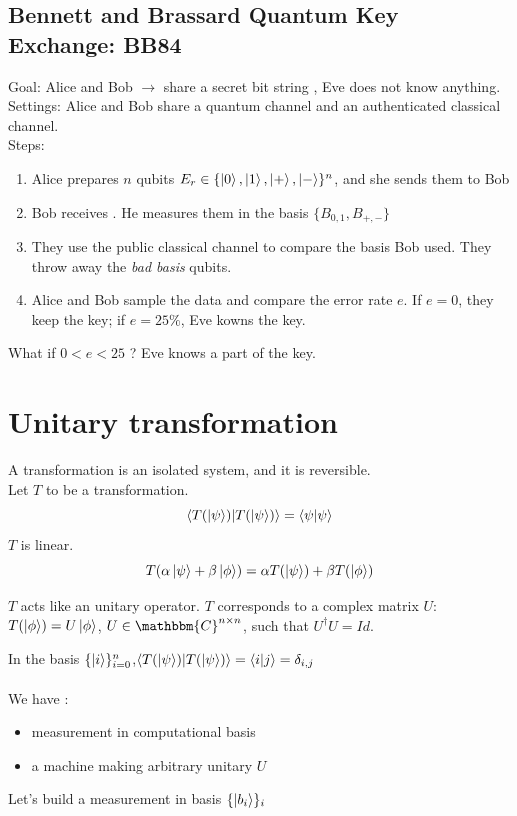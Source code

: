 \documentclass{article}
\begin{document}
\subsection{Bennett and Brassard Quantum Key Exchange: BB84}
Goal: Alice and Bob $\rightarrow$ share a secret bit string , Eve does not know anything.
\\
Settings: Alice and Bob share a quantum channel and an authenticated classical channel.
\\\noindent
Steps:
\begin{enumerate}
    \item Alice prepares $n$ qubits $E_r \in \{\ket{0}, \ket{1}, \ket{+}, \ket{-}\}^n$, and she sends them to Bob
    \item Bob receives . He measures them in the basis $\{B_{0,1}, B_{+,-}\}$
    \item They use the public classical channel to compare the basis Bob used. They throw away the \textit{bad basis} qubits.
    \item Alice and Bob sample the data and compare the error rate $e$. If $e=0$, they keep the key;
        if $e = 25\%$, Eve kowns the key.
\end{enumerate}
What if $0 < e < 25$ ? Eve knows a part of the key.
\section{Unitary transformation}
A transformation is an isolated system, and it is reversible. \\
Let $T$ to be a transformation.
\begin{equation}
    \braket{T(\ket{\psi})|T(\ket{\psi})}=\braket{\psi|\psi}
\end{equation}
$T$ is linear.
\begin{equation}
    T(\alpha\ket{\psi} + \beta\ket{\phi}) = \alpha T(\ket{\psi}) + \beta T(\ket{\phi})
\end{equation}

$T$ acts like an unitary operator.
$T$ corresponds to a complex matrix $U$: $T(\ket{\phi}) = U\ket{\phi}$, $U \in \mathbbm{C}^{n \times n}$,
such that $U^\dagger U= Id$.

In the basis $\{\ket{i}\}_{i=0}^n$,$\braket{T(\ket{\psi})|T(\ket{\psi})} = \braket{i|j} = \delta_{i,j}$
\\
\\
We have :
\begin{itemize}[label=-]
    \item measurement in computational basis
    \item a machine making arbitrary unitary $U$
\end{itemize}
Let's build a measurement in basis $\{\ket{b_i}\}_i$
\end{document}
